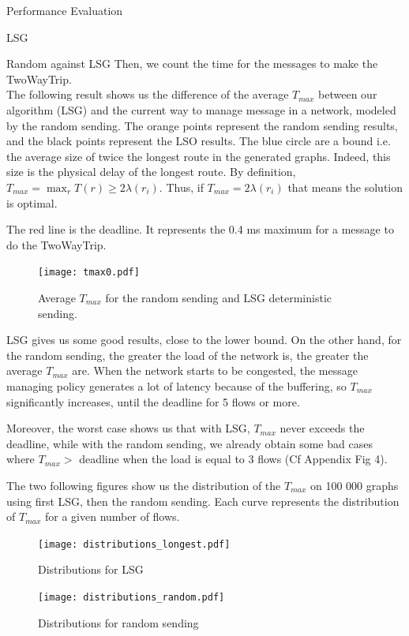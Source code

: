 \documentclass[a4paper,10pt]{report}
\begin{document}
\begin{chapter}{Performance Evaluation}
\begin{section}{LSG}
\begin{subsection}{Random against LSG}
Then, we count the time for the messages to make the TwoWayTrip.\\
 
The following result shows us the difference of the average $T_{max}$ between our algorithm (LSG) and the current way to manage message in a network, modeled by the random sending.
The orange points represent the random sending results, and the black points represent the LSO results.
The blue circle are a bound i.e. the average size of twice the longest route in the generated graphs.
Indeed, this size is the physical delay of the longest route.
By definition, $T_{max} = \max_r T(r) \geq 2\lambda(r_i)$.
Thus, if $T_{max} = 2\lambda(r_i)$  that means the solution is optimal.

The red line is the deadline. It represents the 0.4 ms maximum for a message to do the TwoWayTrip.

\begin{figure}[H]
\hspace*{-3cm}
\centering
\texttt{[image: tmax0.pdf]}%
\caption{Average $T_{max}$ for the random sending and LSG deterministic sending.}
\end{figure}

LSG gives us some good results, close to the lower bound. On the other hand, for the random sending, 
the greater the load of the network is, the greater the average $T_{max}$ are. When the network starts to be congested, the 
message managing policy generates a lot of latency because of the buffering, so $T_{max}$ significantly increases, until the deadline for 5 flows or more.


Moreover, the worst case shows us that with LSG, $T_{max}$ never exceeds the deadline, while with the random sending, we already obtain some bad cases where $T_{max} > $ deadline when the load is equal to 3 flows (Cf Appendix Fig 4).


The two following figures show us the distribution of the $T_{max}$ on 100 000 graphs using first LSG, then the
random sending.
Each curve represents the distribution of $T_{max}$ for a given number of flows.
\begin{figure}[H]
\hspace*{-4cm}
\centering
\texttt{[image: distributions\_longest.pdf]}%
\caption{Distributions for LSG}
\end{figure}

\begin{figure}[H]
\hspace*{-3cm}
\centering
\texttt{[image: distributions\_random.pdf]}%
\caption{Distributions for random sending}
\end{figure}


\end{subsection}
\end{section}
\end{chapter}
\end{document}
